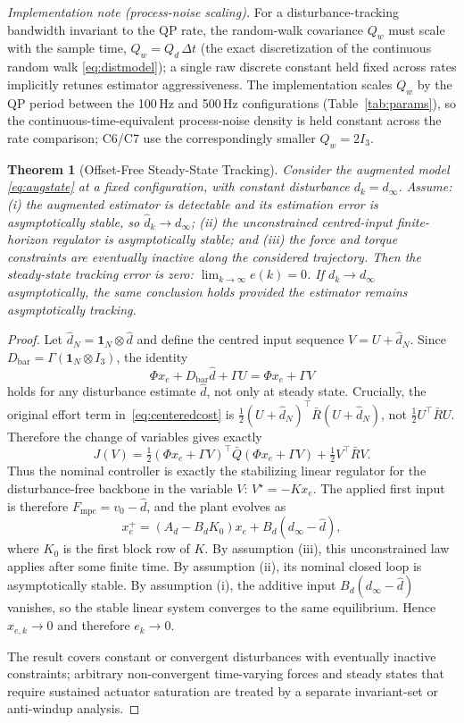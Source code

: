 \documentclass[journal]{IEEEtran}
\newtheorem{theorem}{Theorem}
\newcommand{\Fmpc}{F_{\text{mpc}}}
\begin{document}
\textit{Implementation note (process-noise scaling).}
For a disturbance-tracking bandwidth invariant to the QP rate, the random-walk
covariance $Q_w$ must scale with the sample time, $Q_w=Q_d\,\Delta t$ (the
exact discretization of the continuous random walk \eqref{eq:distmodel}); a
single raw discrete constant held fixed across rates implicitly retunes
estimator aggressiveness. The implementation scales $Q_w$ by the QP period
between the 100\,Hz and 500\,Hz configurations (Table~\ref{tab:params}), so
the continuous-time-equivalent process-noise density is held constant across
the rate comparison; C6/C7 use the correspondingly smaller $Q_w=2I_3$.

\begin{theorem}[Offset-Free Steady-State Tracking]\label{thm:zss}
Consider the augmented model \eqref{eq:augstate} at a fixed
configuration, with constant disturbance $d_k=d_\infty$. Assume:
(i) the augmented estimator is detectable and its estimation error is
asymptotically stable, so $\hat d_{k}\to d_\infty$; (ii) the unconstrained
centred-input finite-horizon regulator is asymptotically stable; and
(iii) the force and torque constraints are eventually inactive along the
considered trajectory. Then the
steady-state tracking error is zero:
$\lim_{k\to\infty}e(k)=0$. If $d_k\to d_\infty$ asymptotically, the
same conclusion holds provided the estimator remains asymptotically
tracking.
\end{theorem}
\begin{proof}
Let $\hat d_N=\mathbf 1_N\otimes\hat d$ and define the centred input sequence
$V=U+\hat d_N$. Since $D_{\text{bar}}=\Gamma(\mathbf 1_N\otimes I_3)$, the
identity
\[
  \Phi x_e+D_{\text{bar}}\hat d+\Gamma U=\Phi x_e+\Gamma V
\]
holds for any disturbance estimate $\hat d$, not only at steady state.
Crucially, the original effort term in~\eqref{eq:centeredcost} is
$\tfrac12(U+\hat d_N)^\top\bar R(U+\hat d_N)$, not
$\tfrac12U^\top\bar RU$. Therefore the change of variables gives exactly
\begin{equation*}
 J(V)=\tfrac12(\Phi x_e+\Gamma V)^\top\bar Q(\Phi x_e+\Gamma V)
 +\tfrac12 V^\top\bar R V .
\end{equation*}
Thus the nominal controller is exactly the stabilizing linear regulator for
the disturbance-free backbone in the variable $V$: $V^\star=-Kx_e$. The
applied first input is therefore $\Fmpc=v_0-\hat d$, and the plant evolves as
\begin{equation*}
  x_e^+=(A_d-B_dK_0)x_e+B_d(d_\infty-\hat d),
\end{equation*}
where $K_0$ is the first block row of $K$. By assumption (iii), this
unconstrained law applies after some finite time. By assumption (ii), its nominal
closed loop is asymptotically stable. By assumption (i), the additive input
$B_d(d_\infty-\hat d)$ vanishes, so the stable linear system converges to the
same equilibrium. Hence $x_{e,k}\to0$ and therefore $e_k\to0$.

The result covers constant or convergent disturbances with eventually
inactive constraints; arbitrary non-convergent time-varying forces and
steady states that require sustained actuator saturation are treated by a
separate invariant-set or anti-windup analysis.
\end{proof}
\end{document}
